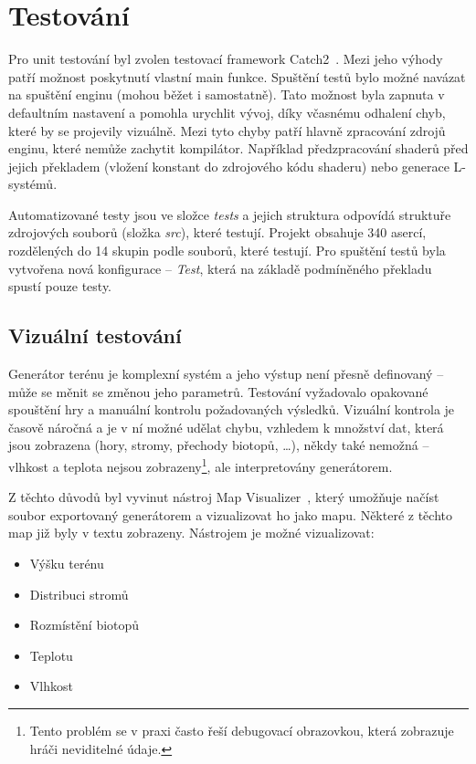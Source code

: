 \documentclass[thesis=M,czech]{FITthesis}[2019/12/23]
\begin{document}

\chapter{Testování}

Pro unit testování byl zvolen testovací framework Catch2~\cite{catch2}. Mezi jeho výhody patří možnost poskytnutí vlastní main funkce. Spuštění testů bylo možné navázat na spuštění enginu (mohou běžet i samostatně). Tato možnost byla zapnuta v defaultním nastavení a pomohla urychlit vývoj, díky včasnému odhalení chyb, které by se projevily vizuálně. Mezi tyto chyby patří hlavně zpracování zdrojů enginu, které nemůže zachytit kompilátor. Například před\-zpracování shaderů před jejich překladem (vložení konstant do zdrojového kódu shaderu) nebo generace L-systémů.

Automatizované testy jsou ve složce \textit{tests} a jejich struktura odpovídá struktuře zdrojových souborů (složka \textit{src}), které testují. Projekt obsahuje 340 asercí, rozdělených do 14 skupin podle souborů, které testují. Pro spuštění testů byla vytvořena nová konfigurace -- \textit{Test}, která na základě podmíněného překladu spustí pouze testy.

\section{Vizuální testování}

Generátor terénu je komplexní systém a jeho výstup není přesně definovaný -- může se měnit se změnou jeho parametrů. Testování vyžadovalo opakované spouštění hry a manuální kontrolu požadovaných výsledků. Vizuální kontrola je časově náročná a je v ní možné udělat chybu, vzhledem k množství dat, která jsou zobrazena (hory, stromy, přechody biotopů, \dots), někdy také nemožná -- vlhkost a teplota nejsou zobrazeny\footnote{Tento problém se v praxi často řeší debugovací obrazovkou, která zobrazuje hráči neviditelné údaje.}, ale interpretovány generátorem.

Z těchto důvodů byl vyvinut nástroj Map Visualizer~\cite{map_vis}, který umožňuje načíst soubor exportovaný generátorem a vizualizovat ho jako mapu. Některé z těchto map již byly v textu zobrazeny. Nástrojem je možné vizualizovat:

\begin{itemize}
\item Výšku terénu
\item Distribuci stromů
\item Rozmístění biotopů
\item Teplotu
\item Vlhkost
\end{itemize}
\end{document}
